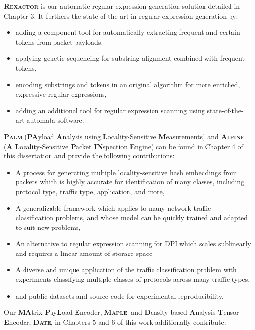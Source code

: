 \textbf{\textsc{Rexactor}} is our automatic regular expression generation solution detailed in Chapter 3. It furthers the state-of-the-art in regular expression generation by:

\begin{itemize}
\item adding a component tool for automatically extracting frequent and certain tokens from packet payloads,
\item applying genetic sequencing for substring alignment combined with frequent tokens,
\item encoding substrings and tokens in an original algorithm for more enriched, expressive regular expressions,
\item adding an additional tool for regular expression scanning using state-of-the-art automata software. \end{itemize}

\textbf{\textsc{Palm}} (\textbf{PA}yload \textbf{A}nalysis using \textbf{L}ocality-Sensitive \textbf{M}easurements) and \textbf{\textsc{Alpine}} (\textbf{A} \textbf{L}ocality-Sensitive \textbf{P}acket \textbf{IN}spection \textbf{E}ngine) can be found in Chapter 4 of this dissertation and provide the following contributions:

\begin{itemize}
\item A process for generating multiple locality-sensitive hash embeddings from packets which is highly accurate for identification of many classes, including protocol type, traffic type, application, and more,
\item A generalizable framework which applies to many network traffic classification problems, and whose model can be quickly trained and adapted to suit new problems,
\item An alternative to regular expression scanning for DPI which scales sublinearly and requires a linear amount of storage space,
\item A diverse and unique application of the traffic classification problem with experiments classifying multiple classes of protocols across many traffic types,
\item and public datasets and source code for experimental reproducibility.
\end{itemize}

Our \textbf{MA}trix \textbf{P}ay\textbf{L}oad \textbf{E}ncoder, \textbf{\textsc{Maple}}, and \textbf{D}ensity-based \textbf{A}nalysis \textbf{T}ensor \textbf{E}ncoder, \textbf{\textsc{Date}}, in Chapters 5 and 6 of this work additionally contribute:

